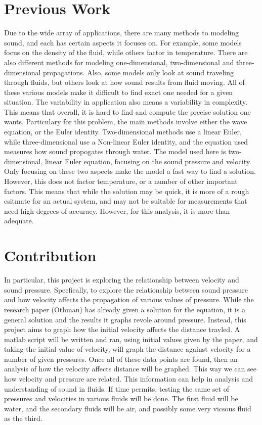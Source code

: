 \documentclass{article}
\begin{document}
\section{Previous Work}
Due to the wide array of applications, there are many methods to modeling sound, and each has certain
aspects it focuses on. For example, some models focus on the density of the fluid, while others factor
in temperature. There are also different methods for modeling one-dimensional, two-dimensional and
three-dimensional propagations. Also, some models only look at sound traveling through fluids, but
others look at how sound results from fluid moving. All of these various models make it difficult to 
find exact one needed for a given situation. The variability in application also means a variability 
in complexity. This means that overall, it is hard to find and compute the precise solution one wants.
Particulary for this problem, the main methods involve either the wave equation, or the Euler identity. 
Two-dimensional methods use a linear Euler, while three-dimensional use a Non-linear Euler identity, 
and the equation used measures how sound propogates through water. The model used here is two-dimensional,
linear Euler equation, focusing on the sound pressure and velocity. Only focusing on these two aspects
make the model a fast way to find a solution. However, this does not factor temperature, or a number of 
other important factors. This means that while the solution may be quick, it is more of a rough esitmate
for an actual system, and may not be suitable for measurements that need high degrees of accuracy.
However, for this analysis, it is more than adequate.

\section{Contribution}
In particular, this project is exploring the relationship between velocity and sound pressure. 
Specfically, to explore the relationship between sound pressure and how velocity affects the
propagation of various values of pressure. While the research paper (Othman) has already given a solution
for the equation, it is a general solution and the results it graphs revole around pressure. Instead,
this project aims to graph how the initial velocity affects the distance travled. A matlab script
will be written and ran, using initial values given by the paper, and taking the initial value of velocity,
will graph the distance against velocity for a number of given pressures. Once all of these data points are
found, then an analysis of how the velocity affects distance will be graphed. This way we can see how velocity
and pressure are related. This information can help in analysis and understanding of sound in fluids.
If time permits, testing the same set of pressures and velocities in various fluids will be done. The first
fluid will be water, and the secondary fluids will be air, and possibly some very vicsous fluid as the third.
\end{document}
